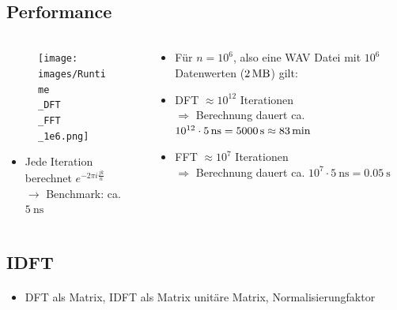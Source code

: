 \subsection{Performance}
\begin{frame}{\insertsection}
	\framesubtitle{\insertsubsection}

	\begin{columns}[T] %
	\begin{column}{0.6\textwidth}
		\begin{figure}
			\centering
			\texttt{[image: images/Runtime\\\_DFT\\\_FFT\\\_1e6.png]}
		\end{figure}
		\begin{itemize}
			\item Jede Iteration berechnet $e^{-2\pi i \frac{jk}{n}}$
			\\ $\rightarrow$ Benchmark: ca. $\SI{5}{\nano\second}$
		\end{itemize}
	\end{column}
	\hfill
	\begin{column}{0.48\textwidth}
		\begin{itemize}
			\vspace{1em}
			\item[] Für $n=10^6$, also eine WAV Datei mit $10^6$ Datenwerten ($\SI{2}{\mega\byte}$) gilt:
			\item DFT $ \approx 10^{12}$ Iterationen
			\\ $\Rightarrow$ Berechnung dauert ca. $10^{12} \cdot \SI{5}{\nano\second} = \SI{5000}{\second} \newline \approx \SI{83}{\minute}$ 
			\item FFT $ \approx 10^{7}$ Iterationen
			\\ $\Rightarrow$ Berechnung dauert ca. $10^{7} \cdot \SI{5}{\nano\second} = \SI{0.05}{\second}$
		\end{itemize}
	\end{column}
	\end{columns}
\end{frame}



\subsection{IDFT}
\begin{frame}{\insertsection}
	\framesubtitle{\insertsubsection}
	
	\begin{itemize}
		\item DFT als Matrix, IDFT als Matrix unitäre Matrix, Normalisierungfaktor
	\end{itemize}
\end{frame}


